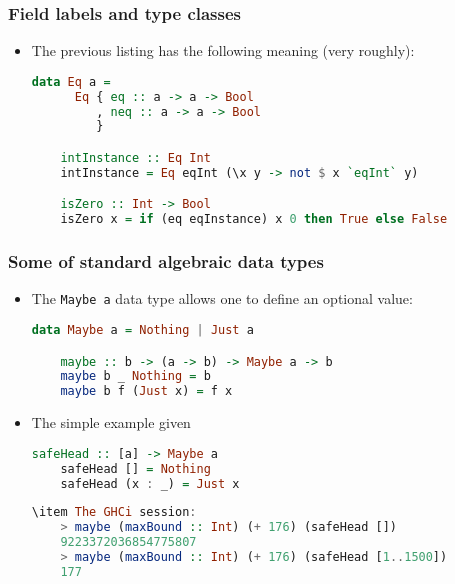 \documentclass[10pt,pdf,utf8,russian,aspectratio=169]{beamer}
\begin{document}
\begin{frame}[fragile]
  \frametitle{Field labels and type classes}

  \begin{itemize}
    \item The previous listing has the following meaning (very roughly):
    \begin{lstlisting}[language=Haskell]
    data Eq a =
      Eq { eq :: a -> a -> Bool
         , neq :: a -> a -> Bool
         }

    intInstance :: Eq Int
    intInstance = Eq eqInt (\x y -> not $ x `eqInt` y)

    isZero :: Int -> Bool
    isZero x = if (eq eqInstance) x 0 then True else False
    \end{lstlisting}
  \end{itemize}
\end{frame}

\begin{frame}[fragile]
  \frametitle{Some of standard algebraic data types}
  \begin{itemize}
    \item The \verb"Maybe a" data type allows one to define an optional value:
    \begin{lstlisting}[language=Haskell]
    data Maybe a = Nothing | Just a

    maybe :: b -> (a -> b) -> Maybe a -> b
    maybe b _ Nothing = b
    maybe b f (Just x) = f x
    \end{lstlisting}
    \item The simple example given
    \begin{lstlisting}[language=Haskell]
    safeHead :: [a] -> Maybe a
    safeHead [] = Nothing
    safeHead (x : _) = Just x
    \end{lstlisting}
    \begin{lstlisting}[language=Haskell]
    \item The GHCi session:
    > maybe (maxBound :: Int) (+ 176) (safeHead [])
    9223372036854775807
    > maybe (maxBound :: Int) (+ 176) (safeHead [1..1500])
    177
    \end{lstlisting}
  \end{itemize}
\end{frame}
\end{document}
